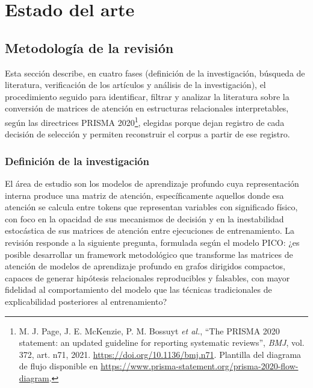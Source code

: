 
\chapter{Estado del arte}
\label{cap:estado_arte}

\section{Metodología de la revisión}

Esta sección describe, en cuatro fases (definición de la investigación, búsqueda de literatura, verificación de los artículos y análisis de la investigación), el procedimiento seguido para identificar, filtrar y analizar la literatura sobre la conversión de matrices de atención en estructuras relacionales interpretables, según las directrices PRISMA 2020\footnote{M. J. Page, J. E. McKenzie, P. M. Bossuyt \emph{et al.}, ``The PRISMA 2020 statement: an updated guideline for reporting systematic reviews'', \emph{BMJ}, vol. 372, art. n71, 2021. \url{https://doi.org/10.1136/bmj.n71}. Plantilla del diagrama de flujo disponible en \url{https://www.prisma-statement.org/prisma-2020-flow-diagram}.}, elegidas porque dejan registro de cada decisión de selección y permiten reconstruir el corpus a partir de ese registro.

\subsection{Definición de la investigación}

El área de estudio son los modelos de aprendizaje profundo cuya representación interna produce una matriz de atención, específicamente aquellos donde esa atención se calcula entre tokens que representan variables con significado físico, con foco en la opacidad de sus mecanismos de decisión y en la inestabilidad estocástica de sus matrices de atención entre ejecuciones de entrenamiento. La revisión responde a la siguiente pregunta, formulada según el modelo PICO: ¿es posible desarrollar un framework metodológico que transforme las matrices de atención de modelos de aprendizaje profundo en grafos dirigidos compactos, capaces de generar hipótesis relacionales reproducibles y falsables, con mayor fidelidad al comportamiento del modelo que las técnicas tradicionales de explicabilidad posteriores al entrenamiento?

